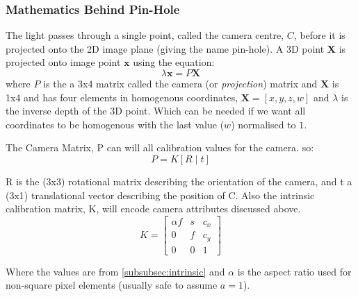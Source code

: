 \subsubsection{Mathematics Behind Pin-Hole}
The light passes through a single point, called the camera centre, $C$, before it is projected onto the 2D image plane (giving the name pin-hole). 
A 3D point $\textbf{X}$ is projected onto image point $\textbf{x}$ using the equation:
\[\lambda \textbf{x} = P\textbf{X}\]
where $P$ is the a 3x4 matrix called the camera (or \emph{projection}) matrix and $\textbf{X}$ is 1x4 and has four elements in homogenous coordinates, \(\textbf{X} = [x, y, z, w]\) and $\lambda$ is the inverse depth of the 3D point. Which can be needed if we want all coordinates to be homogenous with the last value ($w$) normalised to $1$.

The Camera Matrix, P can will all calibration values for the camera. so:
\[P = K \left[R \mid t\right] \]

R is the (3x3) rotational matrix describing the orientation of the camera, and t a (3x1) translational vector describing the position of C.
Also the intrinsic calibration matrix, K, will encode camera attributes discussed above.
\[
  K = 
  \begin{bmatrix}
    \alpha f & s & c_x \\
    0 & f & c_y \\
    0 & 0 & 1
  \end{bmatrix}
\]

Where the values are from \ref{subsubsec:intrinsic} and $\alpha$ is the aspect ratio used for non-square pixel elements (usually safe to assume $a=1$).